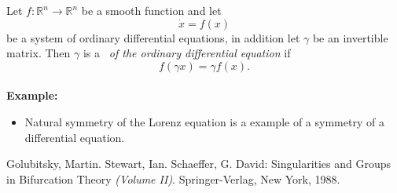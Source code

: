 \documentclass[12pt]{article}
\begin{document}
Let $ f:\mathbb{R}^n \to \mathbb{R}^n$ be a smooth function and let
$$\dot{x} = f(x)$$
be a system of ordinary differential equations, in addition let $\gamma$ be an invertible matrix.  Then $\gamma$ is a \emph{\ of the ordinary differential equation} if
$$f(\gamma x) = \gamma f(x).$$\\
\textbf{Example:}
\begin{itemize}
\item Natural symmetry of the Lorenz equation is a  example of a symmetry of a differential equation.
\end{itemize}
\begin{thebibliography}{1}
 Golubitsky, Martin. Stewart, Ian. Schaeffer, G. David: Singularities and Groups in Bifurcation Theory \textit{(Volume II)}. Springer-Verlag, New York, 1988.
\end{thebibliography}
\end{document}
